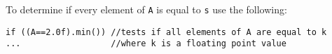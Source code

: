 \begin{description}
To determine if every element of {\tt A} is equal to {\tt s} use the
following:
\begin{tt}
\begin{verbatim}
if ((A==2.0f).min()) //tests if all elements of A are equal to k
...                  //where k is a floating point value
\end{verbatim}
\end{tt}
\end{description}

